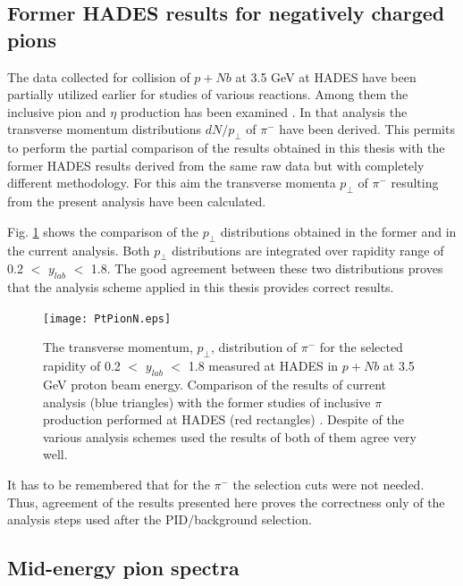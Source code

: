 \subsection{\label{consistency_pim} Former HADES results for negatively charged pions
}

The data collected for collision of $p+Nb$ at 3.5 GeV at HADES have been partially utilized earlier for studies 
of various reactions. Among them the inclusive pion and $\eta$ production has been examined \cite{AgakishievPionP}. 
In that analysis the transverse momentum distributions $dN/p_{\bot}$ 
of $\pi^{-}$ have been derived. 
This permits to perform the partial comparison of the results obtained in this thesis with the former HADES results derived from the same raw data but with completely different methodology. For this aim the transverse 
momenta $p_{\bot}$ of $\pi^{-}$ resulting from the present analysis have been calculated.

Fig. \ref{Comp_HADES_pt1} shows the comparison of the $p_{\bot}$ distributions obtained in the former and in the current analysis. 
Both $p_{\bot}$ distributions are integrated over rapidity 
range of 0.2 $<$ $y_{lab}$ $<$ 1.8.  
The good agreement between these two distributions proves that the analysis scheme applied in this thesis provides correct results.

\begin{figure}[!ht]
\centering
	\texttt{[image: PtPionN.eps]}%
	\caption{\label{Comp_HADES_pt1} 
		The transverse momentum, $p_{\bot}$, distribution of $\pi^{-}$ for the selected rapidity of 0.2 $<$ $y_{lab}$ $<$ 1.8 measured at HADES in $p+Nb$ at 3.5 GeV proton beam energy.
		Comparison of the results of current analysis (blue triangles) with the former studies of inclusive $\pi$ production performed at HADES 
		(red rectangles) \cite{AgakishievPionP}. 
		Despite of the various analysis schemes used the results of both of them agree very well.
	}
\end{figure}

It has to be remembered that for the $\pi^{-}$ the selection cuts 
were not needed. 
Thus, agreement of the results presented here 
proves the correctness only of the analysis steps used after the PID/background selection. 

\subsection{\label{pion_data} Mid-energy pion spectra}

